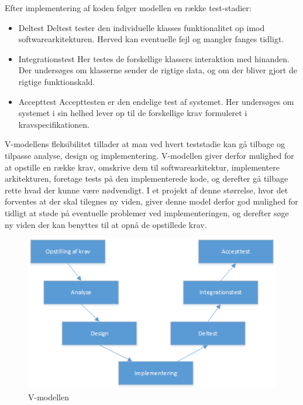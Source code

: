 \documentclass[rapport.tex]{subfiles}
\begin{document}
	Efter implementering af koden følger modellen en række test-stadier:
	\begin{itemize}
		\item Deltest
		\subitem Deltest tester den individuelle klasses funktionalitet op imod softwarearkitekturen. Herved kan eventuelle fejl og mangler fanges tidligt. 
		\item Integrationstest
		\subitem Her testes de forskellige klassers interaktion med hinanden. Der undersøges om klasserne sender de rigtige data, og om der bliver gjort de rigtige funktionskald. 
		\item Accepttest
		\subitem Accepttesten er den endelige test af systemet. Her undersøges om systemet i sin helhed lever op til de forskellige krav formuleret i kravspecifikationen. \\
		
	\end{itemize}
	
	
	V-modellens fleksibilitet tillader at man ved hvert teststadie kan gå tilbage og tilpasse analyse, design og implementering. 
	V-modellen giver derfor mulighed for at opstille en række krav, omskrive dem til softwarearkitektur, implementere arkitekturen, foretage tests på den implementerede kode, og derefter gå tilbage rette hvad der kunne være nødvendigt. 
	I et projekt af denne størrelse, hvor det forventes at der skal tilegnes ny viden, giver denne model derfor god mulighed for tidligt at støde på eventuelle problemer ved implementeringen, og derefter søge ny viden der kan benyttes til at opnå de opstillede krav. 
	
	\begin{figure}[H]
		\centering
		\includegraphics[width=0.9\linewidth]{Vmodel}
		\caption[V-modellen]{V-modellen}
		\label{fig:Vmodel}
	\end{figure}
	
\end{document}
